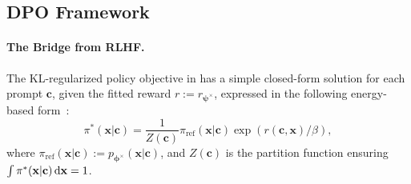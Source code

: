 






\subsection{DPO Framework}\label{subsec:dpo}
\paragraph{The Bridge from RLHF.}
The KL-regularized policy objective in  has a simple closed-form solution for each prompt $\mathbf c$, given the fitted reward $r := r_{\bm\psi^\times}$, expressed in the following energy-based form~\citep{peters2010relative}:
\begin{equation}\label{eq:rlhf-closed-form}
\pi^*(\mathbf x|\mathbf c)
=
\frac{1}{Z(\mathbf c)} \pi_{\mathrm{ref}}(\mathbf x|\mathbf c)\exp(r(\mathbf c,\mathbf x)/\beta),
\end{equation}
where $\pi_{\mathrm{ref}}(\mathbf x|\mathbf c):=p_{\bm{\phi}^\times}(\mathbf x|\mathbf c)$,  and $Z(\mathbf c)$ is the partition function ensuring $\int \pi^*(\mathbf x|\mathbf c) \mathop{}\!\mathrm{d} \mathbf x=1$.

